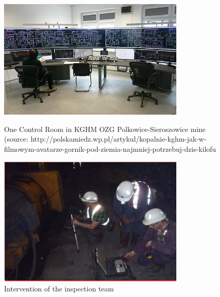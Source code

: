 \documentclass[3p,times,12pt]{elsarticle}
\begin{document}



\begin{figure}[ht!]
\centering
\begin{minipage}[c]{0.48\textwidth}
\centering
\includegraphics[width=0.8\textwidth]{One_control_Room_ZGPS.png}
\caption{One Control Room in KGHM OZG Polkowice-Sieroszowice mine (source: http://polskamiedz.wp.pl/artykul/kopalnie-kghm-jak-w-filmowym-avatarze-gornik-pod-ziemia-najmniej-potrzebuj-dzis-kilofu} 
\label{fig:One_control_Room_ZGPS}
\end{minipage}
\hfill
\begin{minipage}[c]{0.48\textwidth}
	\centering
	\includegraphics[width=0.8\textwidth]{inspection2.png}
	\caption{Intervention of the inspection team}
	\label{fig:inspection2}
	\vspace{1.5cm}
	\end{minipage}
\end{figure}
\end{document}
